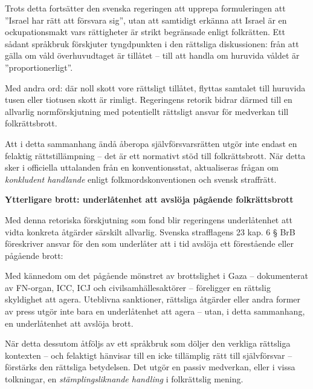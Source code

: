 Trots detta fortsätter den svenska regeringen att upprepa formuleringen att ”Israel har rätt att försvara sig”, 
utan att samtidigt erkänna att Israel är en ockupationsmakt vars rättigheter är strikt begränsade enligt folkrätten. 
Ett sådant språkbruk förskjuter tyngdpunkten i den rättsliga diskussionen: 
från att gälla om våld överhuvudtaget är tillåtet – till att handla om huruvida våldet är ”proportionerligt”.

Med andra ord: där noll skott vore rättsligt tillåtet, flyttas samtalet till huruvida tusen eller tiotusen skott är rimligt. 
Regeringens retorik bidrar därmed till en allvarlig normförskjutning med potentiellt rättsligt ansvar för medverkan 
till folkrättsbrott. 

Att i detta sammanhang ändå åberopa självförsvarsrätten utgör inte endast en felaktig rättstillämpning – det är ett 
normativt stöd till folkrättsbrott. 
När detta sker i officiella uttalanden från en konventionsstat, aktualiseras frågan om \textit{konkludent handlande} 
enligt folkmordskonventionen och svensk straffrätt.


\textbf{Ytterligare brott: underlåtenhet att avslöja pågående folkrättsbrott}

Med denna retoriska förskjutning som fond blir regeringens underlåtenhet att vidta konkreta åtgärder särskilt allvarlig. 
Svenska strafflagens 23 kap. 6 § BrB föreskriver ansvar för den som underlåter att i tid avslöja ett förestående eller pågående brott:


Med kännedom om det pågående mönstret av brottslighet i Gaza – dokumenterat av FN-organ, ICC, ICJ och civilsamhällesaktörer – 
föreligger en rättslig skyldighet att agera. Uteblivna sanktioner, rättsliga åtgärder eller andra former av press utgör inte 
bara en underlåtenhet att agera – utan, i detta sammanhang, en underlåtenhet att avslöja brott.

När detta dessutom åtföljs av ett språkbruk som döljer den verkliga rättsliga kontexten – och felaktigt hänvisar 
till en icke tillämplig rätt till självförsvar – förstärks den rättsliga betydelsen. 
Det utgör en passiv medverkan, eller i vissa tolkningar, en \textit{stämplingsliknande handling} i folkrättslig mening.

